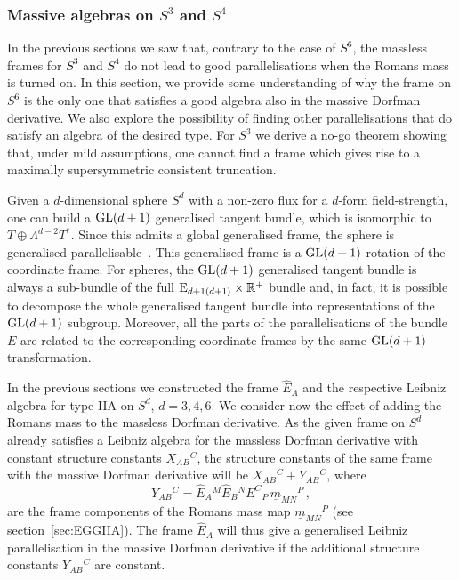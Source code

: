 \documentclass[debug]{phd}
\begin{document}
		\subsubsection{Massive algebras on $S^3$ and $S^4$}\label{massive_algebras}
				In the previous sections we saw that, contrary to the case of $S^6$, the massless frames for $S^3$ and $S^4$ do not lead to good parallelisations when the Romans mass is turned on. 
				In this section, we provide some understanding of why the frame on $S^6$ is the only one that satisfies a good algebra also in the massive Dorfman derivative. 
				We also explore the possibility of finding other parallelisations that do satisfy an algebra of the desired type.
				For $S^3$ we derive a no-go theorem showing that, under mild assumptions, one cannot find a frame which gives rise to a maximally supersymmetric consistent truncation.

				Given a $d$-dimensional sphere $S^d$ with a non-zero flux for a $d$-form field-strength, one can build a $\mathrm{GL}(d+1)$ generalised tangent bundle, which is isomorphic to $T\oplus \Lambda^{d-2}T^*$. 
				Since this admits a global generalised frame, the sphere is generalised parallelisable~\cite{spheres}. 
				This generalised frame is a $\mathrm{GL}(d+1)$ rotation of the coordinate frame. 
				For spheres, the $\mathrm{GL}(d+1)$ generalised tangent bundle is always a sub-bundle of the full $\mathrm{E}_{d+1(d+1)}\times\mathbb{R}^+$ bundle and, in fact, it is possible to decompose the whole generalised tangent bundle into representations of the $\mathrm{GL}(d+1)$ subgroup. 
				Moreover, all the parts of the parallelisations of the bundle $E$ are related to the corresponding coordinate frames by the same $\mathrm{GL}(d+1)$ transformation.

				In the previous sections we constructed the frame $\hat{E}_A$ and the respective Leibniz algebra for type IIA on $S^d$, $d=3,4,6$. 
				We consider now the effect of adding the Romans mass to the massless Dorfman derivative. 
				As the given frame on $S^d$ already satisfies a Leibniz algebra for the massless Dorfman derivative with constant structure constants $X_{AB}{}^C$, the structure constants of the same frame with the massive Dorfman derivative will be $X_{AB}{}^C + Y_{AB}{}^C$, where
							\begin{equation}
								Y_{AB}{}^C = \hat{E}_A{}^M \hat{E}_B{}^N E^C{}_P\, \underline{m}_{MN}{}^P \, , 
							\end{equation}
				are the frame components of the Romans mass map $\underline{m}_{MN}{}^P$ (see section~\ref{sec:EGGIIA}).
				The frame $\hat{E}_A$ will thus give a generalised Leibniz parallelisation in the massive Dorfman derivative if the additional structure constants $Y_{AB}{}^C$ are constant.
 
\end{document}
